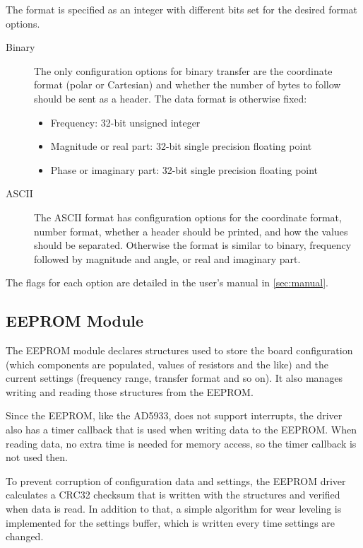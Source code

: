 The format is specified as an integer with different bits set for the desired format options.
%
\begin{description}
  \item[Binary] The only configuration options for binary transfer are the coordinate format (polar or Cartesian) and
    whether the number of bytes to follow should be sent as a header. The data format is otherwise fixed:
    \begin{itemize}
      \item Frequency: 32-bit unsigned integer
      \item Magnitude or real part: 32-bit single precision floating point
      \item Phase or imaginary part: 32-bit single precision floating point
    \end{itemize}
  
  \item[ASCII] The ASCII format has configuration options for the coordinate format, number format, whether a header
    should be printed, and how the values should be separated. Otherwise the format is similar to binary, frequency
    followed by magnitude and angle, or real and imaginary part.
\end{description}

The flags for each option are detailed in the user's manual in \autoref{sec:manual}.


\subsection{EEPROM Module}

The EEPROM module declares structures used to store the board configuration (which components are populated, values of
resistors and the like) and the current settings (frequency range, transfer format and so on). It also manages
writing and reading those structures from the EEPROM.

Since the EEPROM, like the AD5933, does not support interrupts, the driver also has a timer callback that is used when
writing data to the EEPROM. When reading data, no extra time is needed for memory access, so the timer callback is not
used then.

To prevent corruption of configuration data and settings, the EEPROM driver calculates a CRC32 checksum that is written
with the structures and verified when data is read. In addition to that, a simple algorithm for wear leveling\footnotemark{}
is implemented for the settings buffer, which is written every time settings are changed.

